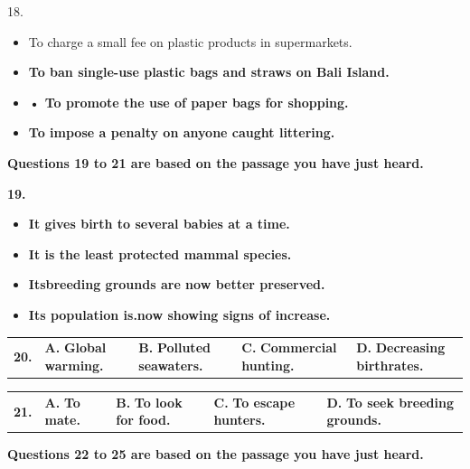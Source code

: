 \documentclass[UTF8,11pt]{ctexart}
\begin{document}
18.


\begin{itemize}[leftmargin=2em,itemsep=.2em,topsep=.4em]\item[A.] To charge a small fee on plastic products in supermarkets.
\end{itemize}

\begin{itemize}[leftmargin=2em,itemsep=.2em,topsep=.4em]\item[B.] \textbf{To ban single-use plastic bags and straws on Bali Island.}
\item[C.] \textbf{• To promote the use of paper bags for shopping.}
\item[D.] \textbf{To impose a penalty on anyone caught littering.}
\end{itemize}

\textbf{Questions 19 to 21 are based on the passage you have just heard.}


\textbf{19.}


\begin{itemize}[leftmargin=2em,itemsep=.2em,topsep=.4em]\item[A.] \textbf{It gives birth to several babies at a time.}
\item[B.] \textbf{It is the least protected mammal species.}
\item[C.] \textbf{Its\textperiodcentered{}breeding grounds are now better preserved.}
\item[D.] \textbf{Its population is.now showing signs of increase.}
\end{itemize}

\noindent\begin{tabularx}{\linewidth}{@{}lXXXX@{}}\textbf{20.} & \textbf{A.} \textbf{Global warming.} & \textbf{B.} \textbf{Polluted seawaters.} & \textbf{C.} \textbf{Commercial hunting.} & \textbf{D.} \textbf{Decreasing birthrates.}\\\end{tabularx}\par

\noindent\begin{tabularx}{\linewidth}{@{}lXXXX@{}}\textbf{21.} & \textbf{A.} \textbf{To mate.} & \textbf{B.} \textbf{To look for food.} & \textbf{C.} \textbf{To escape hunters.} & \textbf{D.} \textbf{To seek breeding grounds.}\\\end{tabularx}\par

\textbf{Questions 22 to 25 are based on the passage you have just heard.}
\end{document}
